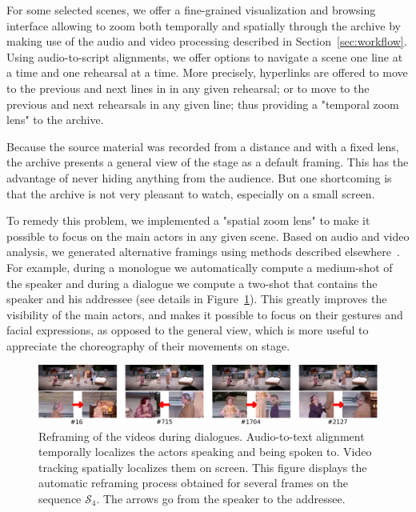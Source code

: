 \documentclass[conference]{IEEEtran}
\begin{document}
For some selected scenes, we offer a fine-grained visualization and browsing interface allowing to zoom both temporally and spatially through the archive by making use of the audio and video processing described in Section~\ref{sec:workflow}.  Using audio-to-script alignments, we offer options to navigate a scene one line at a time and one rehearsal at a time. More precisely, hyperlinks are offered to move to the previous and next lines in in any given rehearsal; or to move to the previous and next rehearsals in any given line; thus providing a "temporal zoom lens" to the archive.

Because the source material was recorded from a distance and with a fixed lens, the archive presents a general view of the stage as a default framing. This has the advantage of never hiding anything from the audience. But one shortcoming is that the archive is not very pleasant to watch, especially on a small screen. 

To remedy this problem, we implemented a "spatial zoom lens" to make it possible to focus on the main actors in any given scene. Based on audio and video analysis, we generated alternative framings using methods described elsewhere~\cite{Gandhi14,Gandhi15}.  For example, during a monologue we automatically
compute a  medium-shot of the speaker and during a dialogue we compute a two-shot that contains the speaker and his addressee (see details in Figure~\ref{fig_speaker}). This greatly improves the visibility of the main actors, and makes it possible to focus on their gestures and facial expressions, as opposed to the general view, which is more useful to appreciate the choreography of their movements on stage.


\begin{figure}[tp]
\centering
\includegraphics[width=\textwidth]{speakers2}
\caption{Reframing of the videos during dialogues.  Audio-to-text alignment temporally localizes the actors speaking and being spoken to. Video tracking  spatially localizes them on screen.  This figure displays the automatic reframing process obtained for several frames on the sequence $\mathcal{S}_4$. The arrows go from the speaker to the addressee.}
\label{fig_speaker}
\end{figure}
\end{document}
